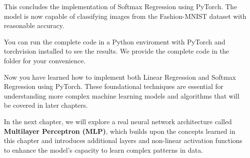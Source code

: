 This concludes the implementation of Softmax Regression using PyTorch. The model is now capable of classifying images from the Fashion-MNIST dataset with reasonable accuracy.

You can run the complete code in a Python enviroment with PyTorch and torchvision installed to see the results. We provide the complete code in the folder for your convenience.

Now you have learned how to implement both Linear Regression and Softmax Regression using PyTorch. These foundational techniques are essential for understanding more complex machine learning models and algorithms that will be covered in later chapters.

In the next chapter, we will explore a real neural network architecture called \textbf{Multilayer Perceptron (MLP)}, which builds upon the concepts learned in this chapter and introduces additional layers and non-linear activation functions to enhance the model's capacity to learn complex patterns in data.
